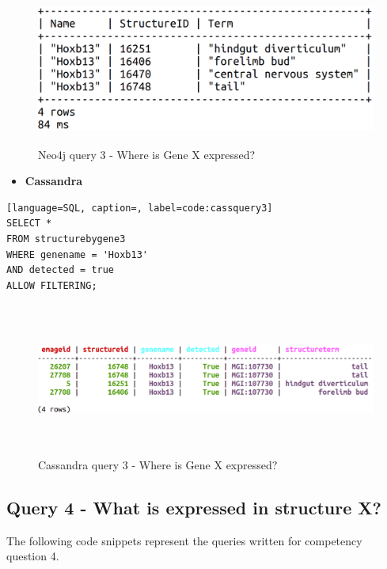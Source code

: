 \begin{figure}[H]\begin{center}\includegraphics[height=5cm,width=0.6\linewidth]{images/neo4jquery3terminal}\caption{Neo4j query 3 - Where is Gene X expressed?}\label{fig:neo4jquery3terminal}\end{center}\end{figure}

\begin{itemize}[leftmargin=*]
\item \textbf{Cassandra}
\end{itemize}

\begin{lstlisting}[language=SQL, caption=, label=code:cassquery3]
SELECT *
FROM structurebygene3
WHERE genename = 'Hoxb13'
AND detected = true
ALLOW FILTERING;
\end{lstlisting}

\begin{figure}[H]\begin{center}\includegraphics[height=5cm,width=1\linewidth]{images/cassandraquery3}\caption{Cassandra query 3 - Where is Gene X expressed?}\label{fig:cassandraquery3}\end{center}\end{figure}

\newpage
\subsection*{Query 4 - What is expressed in structure X?}\label{query4}
The following code snippets represent the queries written for competency question 4.

